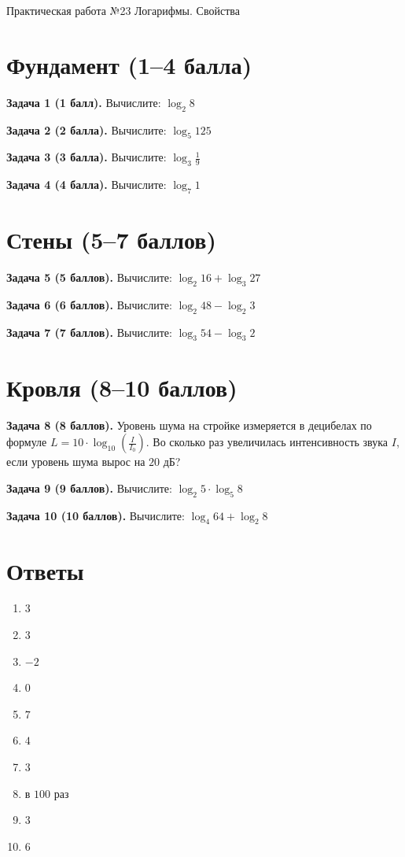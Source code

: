 \documentclass{umk-matematika}
\begin{document}
\maketitlepage
    {Практическая работа №23}
    {Логарифмы. Свойства}
    {}

\section{Фундамент (1--4 балла)}

\textbf{Задача 1 (1 балл).} Вычислите: $\log_{2} 8$

\textbf{Задача 2 (2 балла).} Вычислите: $\log_{5} 125$

\textbf{Задача 3 (3 балла).} Вычислите: $\log_{3} \frac{1}{9}$

\textbf{Задача 4 (4 балла).} Вычислите: $\log_{7} 1$

\section{Стены (5--7 баллов)}

\textbf{Задача 5 (5 баллов).} Вычислите: $\log_{2} 16 + \log_{3} 27$

\textbf{Задача 6 (6 баллов).} Вычислите: $\log_{2} 48 - \log_{2} 3$

\textbf{Задача 7 (7 баллов).} Вычислите: $\log_{3} 54 - \log_{3} 2$

\section{Кровля (8--10 баллов)}

\textbf{Задача 8 (8 баллов).} Уровень шума на стройке измеряется в децибелах по формуле $L = 10 \cdot \log_{10} \left(\frac{I}{I_0}\right)$. Во сколько раз увеличилась интенсивность звука $I$, если уровень шума вырос на $20$ дБ?

\textbf{Задача 9 (9 баллов).} Вычислите: $\log_{2} 5 \cdot \log_{5} 8$

\textbf{Задача 10 (10 баллов).} Вычислите: $\log_{4} 64 + \log_{2} 8$

\newpage
\section*{Ответы}

\begin{enumerate}
  \item $3$
  \item $3$
  \item $-2$
  \item $0$
  \item $7$
  \item $4$
  \item $3$
  \item в $100$ раз
  \item $3$
  \item $6$
\end{enumerate}
\end{document}
